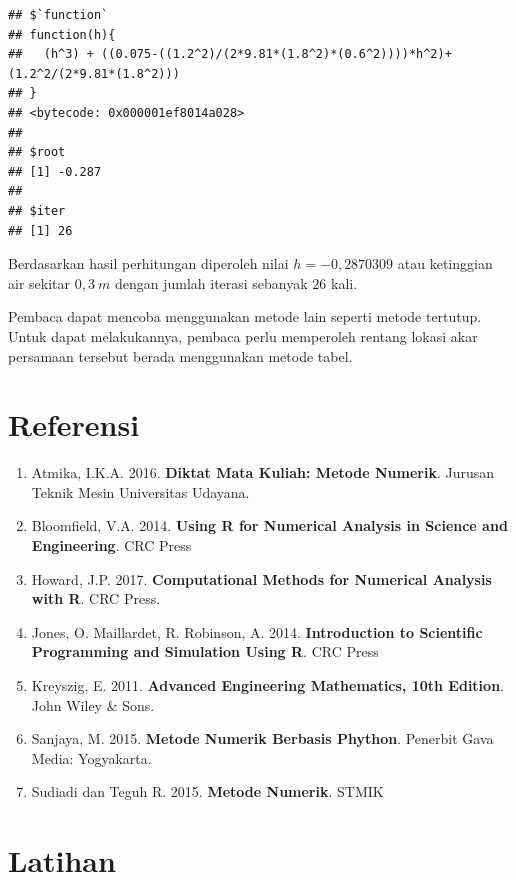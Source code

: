 \documentclass[
]{book}
\providecommand{\tightlist}{%
  \setlength{\itemsep}{0pt}\setlength{\parskip}{0pt}}
\theoremstyle{definition}
\theoremstyle{definition}
\theoremstyle{definition}
\theoremstyle{definition}
\theoremstyle{remark}
\begin{document}
\begin{verbatim}
## $`function`
## function(h){
##   (h^3) + ((0.075-((1.2^2)/(2*9.81*(1.8^2)*(0.6^2))))*h^2)+ (1.2^2/(2*9.81*(1.8^2)))
## }
## <bytecode: 0x000001ef8014a028>
## 
## $root
## [1] -0.287
## 
## $iter
## [1] 26
\end{verbatim}

Berdasarkan hasil perhitungan diperoleh nilai \(h=-0,2870309\) atau ketinggian air sekitar \(0,3\ m\) dengan jumlah iterasi sebanyak \(26\) kali.

Pembaca dapat mencoba menggunakan metode lain seperti metode tertutup. Untuk dapat melakukannya, pembaca perlu memperoleh rentang lokasi akar persamaan tersebut berada menggunakan metode tabel.

\hypertarget{referensi-2}{%
\section{Referensi}\label{referensi-2}}

\begin{enumerate}
\def\labelenumi{\arabic{enumi}.}
\tightlist
\item
  Atmika, I.K.A. 2016. \textbf{Diktat Mata Kuliah: Metode Numerik}. Jurusan Teknik Mesin Universitas Udayana.
\item
  Bloomfield, V.A. 2014. \textbf{Using R for Numerical Analysis in Science and Engineering}. CRC Press
\item
  Howard, J.P. 2017. \textbf{Computational Methods for Numerical Analysis with R}. CRC Press.
\item
  Jones, O. Maillardet, R. Robinson, A. 2014. \textbf{Introduction to Scientific Programming and Simulation Using R}. CRC Press
\item
  Kreyszig, E. 2011. \textbf{Advanced Engineering Mathematics, 10th Edition}. John Wiley \& Sons.
\item
  Sanjaya, M. 2015. \textbf{Metode Numerik Berbasis Phython}. Penerbit Gava Media: Yogyakarta.
\item
  Sudiadi dan Teguh R. 2015. \textbf{Metode Numerik}. STMIK
\end{enumerate}

\hypertarget{latihan-1}{%
\section{Latihan}\label{latihan-1}}
\end{document}
